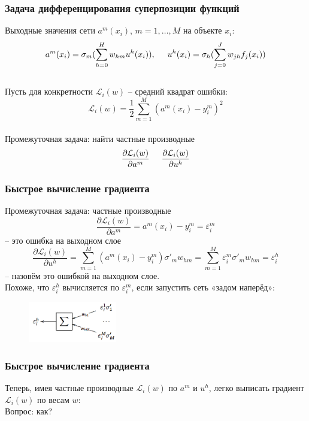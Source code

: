 \documentclass[12pt]{beamer}
\begin{document}
\begin{frame}\frametitle{Задача дифференцирования суперпозиции функций}
Выходные значения сети $a^m(x_i)$, $m = 1,\dots,M$ на объекте $x_i$:\\
$$a^m(x_i) = \sigma_m (\sum\limits_{h=0}^H w_{hm} u^h(x_i)), \hspace{5mm} u^h(x_i) = \sigma_h (\sum\limits_{j=0}^J w_{jh} f_j(x_i))$$\\
Пусть для конкретности $\mathcal{L}_i(w)$ -- средний квадрат ошибки:\\
$$\mathcal{L}_i(w) = \frac{1}{2} \sum\limits_{m=1}^M (a^m(x_i) - y_i^m)^2$$\\
Промежуточная задача: найти частные производные\\
$$\frac {\partial \mathcal{L}_i(w)}{\partial a^m} \hspace{5mm} \frac {\partial \mathcal{L}_i(w)}{\partial u^h}$$
\end{frame}

\begin{frame}\frametitle{Быстрое вычисление градиента}
Промежуточная задача: частные производные\\
$$\frac{\partial \mathcal{L}_i(w)}{\partial a^m} = a^m (x_i) - y_i^m = \varepsilon^m_i$$ -- это ошибка на выходном слое\\
$$\frac{\partial \mathcal{L}_i(w)}{\partial u^h} = \sum\limits_{m=1}^M (a^m(x_i) - y_i^m) \sigma'_m w_{hm} = \sum\limits_{m=1}^M \varepsilon^m_i \sigma'_m w_{hm} = \varepsilon^h_i$$ -- назовём это ошибкой на выходном слое. \\
Похоже, что $\varepsilon_i^h$ вычисляется по $\varepsilon_i^m$, если запустить сеть «задом наперёд»:\\

\begin{figure}[htbp]
  \includegraphics[height=50pt, keepaspectratio = true]{images/backpropagation}   
\end{figure}

\end{frame}

\begin{frame}\frametitle{Быстрое вычисление градиента}
Теперь, имея частные производные $\mathcal{L}_i(w)$ по $a^m$ и $u^h$, легко выписать градиент $\mathcal{L}_i(w)$ по весам $w$:\\
\vspace{5mm}
Вопрос: как?
\end{frame}
\end{document}
